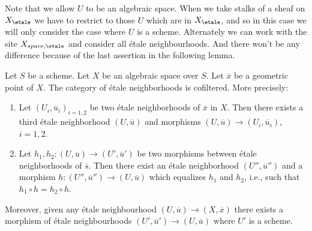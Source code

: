 \noindent
Note that we allow $U$ to be an algebraic space. When we take stalks
of a sheaf on $X_\etale$ we have to restrict to those $U$ which
are in $X_\etale$, and so in this case we will only consider the case
where $U$ is a scheme. Alternately we can work with the site
$X_{space, \etale}$ and consider all \'etale neighbourhoods. And there
won't be any difference because of the last assertion in the following lemma.

\begin{lemma}
\label{lemma-cofinal-etale}
Let $S$ be a scheme. Let $X$ be an algebraic space over $S$.
Let $\overline{x}$ be a geometric point of $X$.
The category of \'etale neighborhoods is cofiltered. More precisely:
\begin{enumerate}
\item Let $(U_i, \overline{u}_i)_{i = 1, 2}$ be two \'etale neighborhoods of
$\overline{x}$ in $X$. Then there exists a third \'etale neighborhood
$(U, \overline{u})$ and morphisms
$(U, \overline{u}) \to (U_i, \overline{u}_i)$, $i = 1, 2$.
\item Let $h_1, h_2: (U, \overline{u}) \to (U', \overline{u}')$ be two
morphisms between \'etale neighborhoods of $\overline{s}$. Then there exist an
\'etale neighborhood $(U'', \overline{u}'')$ and a morphism
$h : (U'', \overline{u}'') \to (U, \overline{u})$
which equalizes $h_1$ and $h_2$, i.e., such that
$h_1 \circ h = h_2 \circ h$.
\end{enumerate}
Moreover, given any \'etale neighbourhood
$(U, \overline{u}) \to (X, \overline{x})$
there exists a morphism of \'etale neighbourhoods
$(U', \overline{u}') \to (U, \overline{u})$
where $U'$ is a scheme.
\end{lemma}

